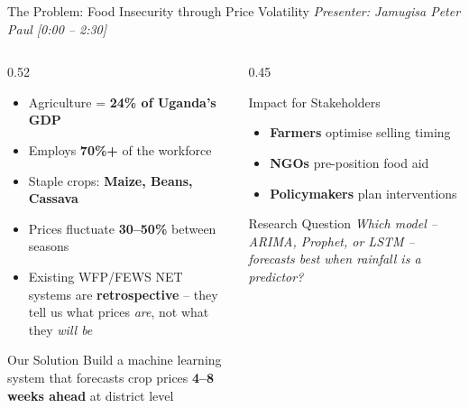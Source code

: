 \documentclass[aspectratio=169,11pt]{beamer}
\begin{document}
\begin{frame}{The Problem: Food Insecurity through Price Volatility}
\textit{\small Presenter: Jamugisa Peter Paul \hfill [0:00 -- 2:30]}
\vspace{0.3em}
\begin{columns}
\begin{column}{0.52\textwidth}
\begin{itemize}
    \item Agriculture = \textbf{24\% of Uganda's GDP}
    \item Employs \textbf{70\%+} of the workforce
    \item Staple crops: \textbf{Maize, Beans, Cassava}
    \item Prices fluctuate \textbf{30--50\%} between seasons
    \item Existing WFP/FEWS NET systems are \textbf{retrospective} -- they tell us what prices \textit{are}, not what they \textit{will be}
\end{itemize}
\vspace{0.3em}
\begin{block}{Our Solution}
Build a machine learning system that forecasts crop prices \textbf{4--8 weeks ahead} at district level
\end{block}
\end{column}
\begin{column}{0.45\textwidth}
\begin{block}{Impact for Stakeholders}
\begin{itemize}
    \item[\checkmark] \textbf{Farmers} optimise selling timing
    \item[\checkmark] \textbf{NGOs} pre-position food aid
    \item[\checkmark] \textbf{Policymakers} plan interventions
\end{itemize}
\end{block}
\vspace{0.3em}
\begin{alertblock}{Research Question}
\small\textit{Which model -- ARIMA, Prophet, or LSTM -- forecasts best when rainfall is a predictor?}
\end{alertblock}
\end{column}
\end{columns}
\end{frame}
\end{document}
